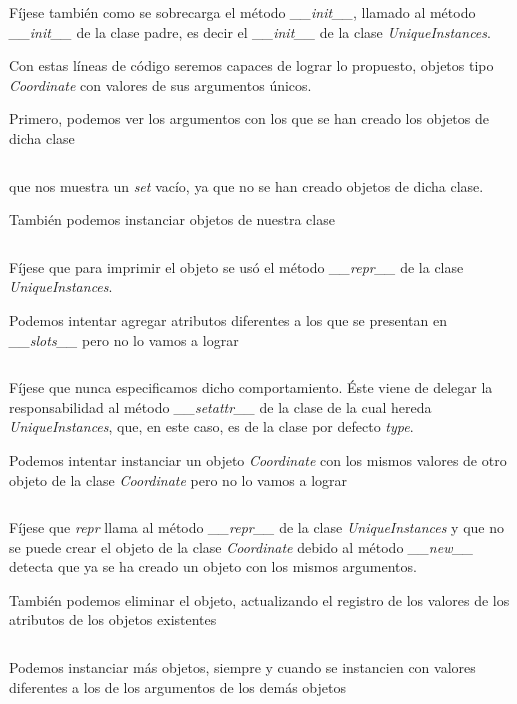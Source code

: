 \documentclass{article}
\begin{document}
	Fíjese también como se sobrecarga el método \emph{\_\_init\_\_}, llamado al método \emph{\_\_init\_\_} de la clase padre, es decir el \emph{\_\_init\_\_}
	de la clase \emph{UniqueInstances}.

	Con estas líneas de código seremos capaces de lograr lo propuesto, objetos tipo \emph{Coordinate} con valores de sus argumentos únicos.

	Primero, podemos ver los argumentos con los que se han creado los objetos de dicha clase
	\inputminted[firstline=59, lastline=60, breaklines]{python}{collection_class.py}
	que nos muestra un \emph{set} vacío, ya que no se han creado objetos de dicha clase.

	También podemos instanciar objetos de nuestra clase
	\inputminted[firstline=63, lastline=64, breaklines]{python}{collection_class.py}

	Fíjese que para imprimir el objeto se usó el método \emph{\_\_repr\_\_} de la clase \emph{UniqueInstances}.

	Podemos intentar agregar atributos diferentes a los que se presentan en \emph{\_\_slots\_\_} pero no lo vamos a lograr
	\inputminted[firstline=67, lastline=70, breaklines]{python}{collection_class.py}

	Fíjese que nunca especificamos dicho comportamiento. Éste viene de delegar la responsabilidad al método \emph{\_\_setattr\_\_} de la clase de la cual hereda \emph{UniqueInstances}, que, en este caso, es de la clase por defecto \emph{type}.

	Podemos intentar instanciar un objeto \emph{Coordinate} con los mismos valores de otro objeto de la clase \emph{Coordinate} pero no lo vamos a lograr
	\inputminted[firstline=76, lastline=77, breaklines]{python}{collection_class.py}

	Fíjese que \emph{repr} llama al método \emph{\_\_repr\_\_} de la clase \emph{UniqueInstances} y que no se puede crear el objeto de la clase \emph{Coordinate} debido al método \emph{\_\_new\_\_} detecta que ya se ha creado un objeto con los mismos argumentos.

	También podemos eliminar el objeto, actualizando el registro de los valores de los atributos de los objetos existentes
	\inputminted[firstline=82,	 lastline=86,breaklines]{python}{collection_class.py}

	Podemos instanciar más objetos, siempre y cuando se instancien con valores diferentes a los de los argumentos de los demás objetos
	\inputminted[firstline=89, lastline=90, breaklines]{python}{collection_class.py}
\end{document}
